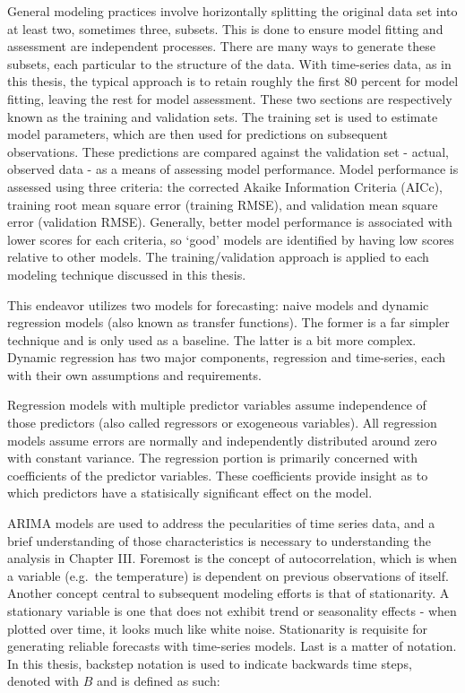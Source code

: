 \documentclass[12pt,letterpaper,toc=flat,oneside]{report}
\theoremstyle{definition}
\theoremstyle{definition}
\theoremstyle{definition}
\theoremstyle{remark}
\begin{document}
General modeling practices involve horizontally splitting the original
data set into at least two, sometimes three, subsets. This is done to
ensure model fitting and assessment are independent processes. There are
many ways to generate these subsets, each particular to the structure of
the data. With time-series data, as in this thesis, the typical approach
is to retain roughly the first 80 percent for model fitting, leaving the
rest for model assessment. These two sections are respectively known as
the training and validation sets. The training set is used to estimate
model parameters, which are then used for predictions on subsequent
observations. These predictions are compared against the validation set
- actual, observed data - as a means of assessing model performance.
Model performance is assessed using three criteria: the corrected Akaike
Information Criteria (AICc), training root mean square error (training
RMSE), and validation mean square error (validation RMSE). Generally,
better model performance is associated with lower scores for each
criteria, so `good' models are identified by having low scores relative
to other models. The training/validation approach is applied to each
modeling technique discussed in this thesis.

This endeavor utilizes two models for forecasting: naive models and
dynamic regression models (also known as transfer functions). The former
is a far simpler technique and is only used as a baseline. The latter is
a bit more complex. Dynamic regression has two major components,
regression and time-series, each with their own assumptions and
requirements.

Regression models with multiple predictor variables assume independence
of those predictors (also called regressors or exogeneous variables).
All regression models assume errors are normally and independently
distributed around zero with constant variance. The regression portion
is primarily concerned with coefficients of the predictor variables.
These coefficients provide insight as to which predictors have a
statisically significant effect on the model.

ARIMA models are used to address the pecularities of time series data,
and a brief understanding of those characteristics is necessary to
understanding the analysis in Chapter III. Foremost is the concept of
autocorrelation, which is when a variable (e.g.~the temperature) is
dependent on previous observations of itself. Another concept central to
subsequent modeling efforts is that of stationarity. A stationary
variable is one that does not exhibit trend or seasonality effects -
when plotted over time, it looks much like white noise. Stationarity is
requisite for generating reliable forecasts with time-series models.
Last is a matter of notation. In this thesis, backstep notation is used
to indicate backwards time steps, denoted with \(B\) and is defined as
such:
\end{document}
